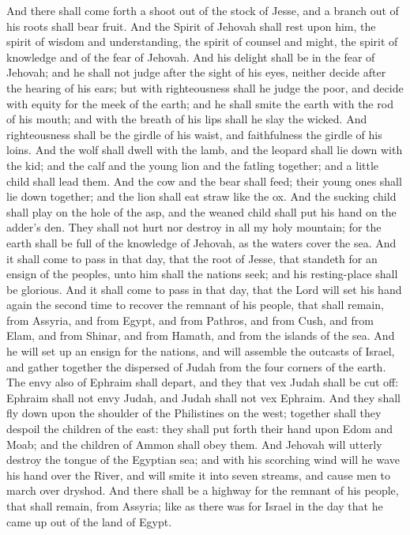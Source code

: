 And there shall come forth a shoot out of the stock of Jesse, and a branch out of his roots shall bear fruit. And the Spirit of Jehovah shall rest upon him, the spirit of wisdom and understanding, the spirit of counsel and might, the spirit of knowledge and of the fear of Jehovah. And his delight shall be in the fear of Jehovah; and he shall not judge after the sight of his eyes, neither decide after the hearing of his ears; but with righteousness shall he judge the poor, and decide with equity for the meek of the earth; and he shall smite the earth with the rod of his mouth; and with the breath of his lips shall he slay the wicked. And righteousness shall be the girdle of his waist, and faithfulness the girdle of his loins.  And the wolf shall dwell with the lamb, and the leopard shall lie down with the kid; and the calf and the young lion and the fatling together; and a little child shall lead them. And the cow and the bear shall feed; their young ones shall lie down together; and the lion shall eat straw like the ox. And the sucking child shall play on the hole of the asp, and the weaned child shall put his hand on the adder’s den. They shall not hurt nor destroy in all my holy mountain; for the earth shall be full of the knowledge of Jehovah, as the waters cover the sea.  And it shall come to pass in that day, that the root of Jesse, that standeth for an ensign of the peoples, unto him shall the nations seek; and his resting-place shall be glorious.  And it shall come to pass in that day, that the Lord will set his hand again the second time to recover the remnant of his people, that shall remain, from Assyria, and from Egypt, and from Pathros, and from Cush, and from Elam, and from Shinar, and from Hamath, and from the islands of the sea. And he will set up an ensign for the nations, and will assemble the outcasts of Israel, and gather together the dispersed of Judah from the four corners of the earth. The envy also of Ephraim shall depart, and they that vex Judah shall be cut off: Ephraim shall not envy Judah, and Judah shall not vex Ephraim. And they shall fly down upon the shoulder of the Philistines on the west; together shall they despoil the children of the east: they shall put forth their hand upon Edom and Moab; and the children of Ammon shall obey them. And Jehovah will utterly destroy the tongue of the Egyptian sea; and with his scorching wind will he wave his hand over the River, and will smite it into seven streams, and cause men to march over dryshod. And there shall be a highway for the remnant of his people, that shall remain, from Assyria; like as there was for Israel in the day that he came up out of the land of Egypt. 

